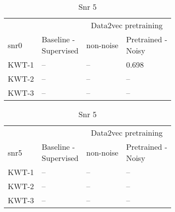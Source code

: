 \begin{table}[ht]
    \begin{subtable}[ht]{0.45\textwidth}
        \centering
        \begin{tabular}{@{}llll@{}}
        \toprule
        & & \multicolumn{2}{c}{Data2vec pretraining} \\ \cline{3-4}
        snr0    & \makecell{ Baseline - \\ Supervised } & non-noise & \makecell{ Pretrained - \\ Noisy } \\ \midrule
        KWT-1    & --  & -- & 0.698 \\
        KWT-2    & --  & -- & -- \\
        KWT-3    & --  & -- & -- \\
        \bottomrule
        \end{tabular}
        \caption{Snr 0}
    \end{subtable}
    \hfill
    \begin{subtable}[ht]{0.45\textwidth}
        \centering
        \begin{tabular}{@{}llll@{}}
        \toprule
        & & \multicolumn{2}{c}{Data2vec pretraining} \\ \cline{3-4}
        snr5    & \makecell{ Baseline - \\ Supervised } & non-noise & \makecell{ Pretrained - \\ Noisy } \\ \midrule
        KWT-1    & --  & -- & -- \\
        KWT-2    & --  & -- & -- \\
        KWT-3    & --  & -- & -- \\
        \bottomrule
        \end{tabular}
        \caption{Snr 5}
    \end{subtable}


    \bigskip



\end{table}
